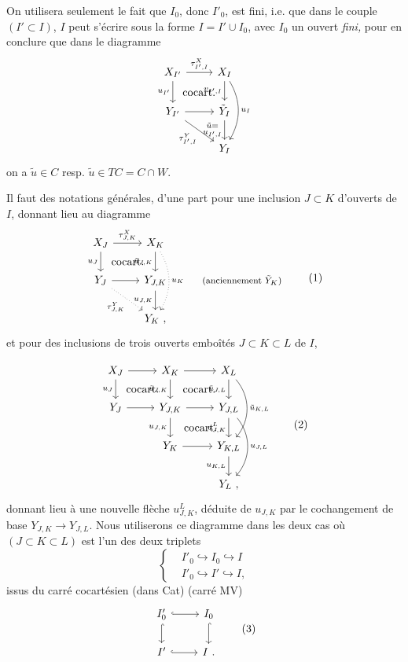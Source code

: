 \documentclass[11pt]{article}
\newcommand{\printedpage}[1]{\marginpar{\footnotesize p.~#1}}
\newcommand{\msp}[1]{\marginpar{\footnotesize [#1]}}
\newcommand{\cocart}{\textup{cocart.}}
\begin{document}
On utilisera seulement le fait que $I_0$, donc $I'_0$, est fini, i.e. que dans le couple $(I' \subset I)$, $I$ peut s'écrire sous la forme $I = I' \cup I_0$, avec $I_0$ un ouvert \textit{fini,} pour en conclure que dans le diagramme
\[
\begin{tikzcd}
X_{I'} \arrow[r, "\tau^X_{I',I}"] \arrow[d, "u_{I'}"'] \arrow[dr, phantom, "\cocart"] & X_I \arrow[d, "v_{I',I}"'] \arrow[dd, bend left=30, "u_I"] \\
Y_{I'} \arrow[r] \arrow[dr, "\tau^Y_{I',I}"'] & \tilde{Y}_I \arrow[d, "\substack{\tilde{u} =\\ u_{I',I}}"'] \\
& Y_I
\end{tikzcd}
\]
on a $\tilde{u} \in C$ resp. $\tilde{u} \in TC = C \cap W$.

\msp{page 14}

Il faut des notations générales, d'une part pour une inclusion $J \subset K$ d'ouverts de $I$, donnant lieu au diagramme
\[
\begin{tikzcd}
X_J \arrow[r, "\tau^X_{J,K}"] \arrow[d, "u_J"'] \arrow[dr, phantom, "\cocart"] & X_K \arrow[d, "\tilde{u}_{J,K}"'] \arrow[dd, dotted, bend left=30, "u_K"] & \\
Y_J \arrow[r] \arrow[dr, dotted, "\tau^Y_{J,K}"'] & Y_{J,K} \arrow[d, "u_{J,K}"'] & \text{\footnotesize (anciennement $\tilde{Y}_K$)} \\
& Y_K\ , &
\end{tikzcd}
\tag*{(1)}
\]
et pour des inclusions de trois ouverts emboîtés $J \subset K \subset L$ de $I$,

\printedpage{9}
\[
\begin{tikzcd}
X_J \arrow[r] \arrow[d, "u_J"'] \arrow[dr, phantom, "\cocart"] & X_K \arrow[r] \arrow[d, "\tilde{u}_{J,K}"'] \arrow[dr, phantom, "\cocart"] & X_L \arrow[d, "\tilde{u}_{J,L}"'] \arrow[dd, bend left=40, "\tilde{u}_{K,L}"] \\
Y_J \arrow[r] & Y_{J,K} \arrow[r] \arrow[d, "u_{J,K}"'] \arrow[dr, phantom, "\cocart"] & Y_{J,L} \arrow[d, "u^L_{J,K}"'] \arrow[dd, bend left=40, "u_{J,L}"] \\
 & Y_K \arrow[r] & Y_{K,L} \arrow[d, "u_{K,L}"'] \\
 & & Y_L\ ,
\end{tikzcd}
\tag*{(2)}
\]
donnant lieu à une nouvelle flèche $u^L_{J,K}$, déduite de $u_{J,K}$ par le cochangement de base \msp{page 15} $Y_{J,K} \longrightarrow Y_{J,L}$. Nous utiliserons ce diagramme dans les deux cas où $(J \subset K \subset L)$ est l'un des deux triplets
\[
\left\{
\begin{aligned}
& I'_0 \hookrightarrow I_0 \hookrightarrow I \\
& I'_0 \hookrightarrow I' \hookrightarrow I,
\end{aligned}
\right.
\]
issus du carré cocartésien (dans Cat) (carré MV)
\[
\begin{tikzcd}
I'_0 \arrow[r, hook] \arrow[d, hook] & I_0 \arrow[d, hook] \\
I' \arrow[r, hook] & I\ .
\end{tikzcd}
\tag*{(3)}
\]
\end{document}
